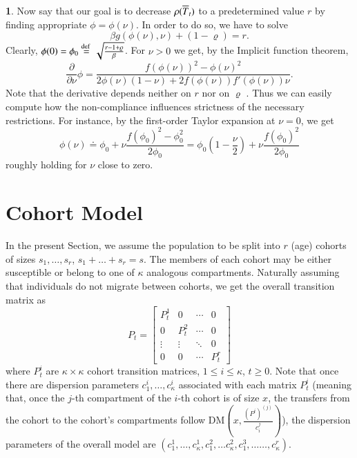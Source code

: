 \documentclass[english]{elsarticle}
\theoremstyle{plain}
\theoremstyle{remark}
\theoremstyle{plain}
\theoremstyle{definition}
\newtheorem{example}[thm]{\protect\examplename}
\providecommand{\examplename}{Example}
\begin{document}
\begin{example}
Now say that our goal is to decrease $\rho(\overline{T}_{t})$ to a predetermined
value $r$ by finding appropriate $\phi=\phi(\nu)$. In order to do
so, we have to solve
\[
\beta g(\phi(\nu),\nu)+(1-\varrho)=r.
\]
Clearly, $\phi(0)=\phi_{0}\stackrel{\text{def }}{=}\sqrt{\frac{r-1+\varrho}{\beta}}$.
For $\nu>0$ we get, by the Implicit function theorem, 
\[
\frac{\partial}{\partial\nu}\phi=\frac{f(\phi(\nu))^{2}-\phi(\nu)^{2}}{2\phi(\nu)(1-\nu)+2f(\phi(\nu))f'(\phi(\nu))\nu}.
\]
Note that the derivative depends neither on $r$ nor on $\varrho$
. Thus we can easily compute how the non-compliance influences strictness
of the necessary restrictions. For instance, by the first-order Taylor
expansion at $\nu=0$, we get 
\[
\phi(\nu)\doteq\phi_{0}+\nu\frac{f(\phi_{0})^{2}-\phi_{0}^{2}}{2\phi_{0}}=\phi_{0}\left(1-\frac{\nu}{2}\right)+\nu\frac{f(\phi_{0})^{2}}{2\phi_{0}}
\]
roughly holding for $\nu$ close to zero.
\end{example}



\section{Cohort Model\label{sec:cohorts}}

In the present Section, we assume the population to be split into
$r$ (age) cohorts of sizes $s_{1},\dots,s_{r}$, $s_{1}+\dots+s_{r}=s$.
The members of each cohort may be either susceptible or belong to
one of $\kappa$ analogous compartments. Naturally assuming that individuals
do not migrate between cohorts, we get the overall transition matrix
as 
\[
P_{t}=\left[\begin{array}{cccc}
P_{t}^{1} & 0 & \cdots & 0\\
0 & P_{t}^{2} & \cdots & 0\\
\vdots & \vdots & \ddots & 0\\
0 & 0 & \cdots & P_{t}^{r}
\end{array}\right]
\]
where $P_{t}^{i}$ are $\kappa\times\kappa$ cohort transition matrices,
$1\leq i\leq\kappa$, $t\geq0$. Note that once there are dispersion
parameters $c_{1}^{i},\dots,c_{\kappa}^{i}$ associated with each
matrix $P_{t}^{i}$ (meaning that, once the $j$-th compartment of
the $i$-th cohort is of size $x$, the transfers from the cohort
to the cohort's compartments follow $\mathrm{DM}(x,\frac{(P^{i})^{(j)}}{c_{i}^{j}})$),
the dispersion parameters of the overall model are $(c_{1}^{1},\dots,c_{\kappa}^{1},c_{1}^{2},\dots c_{\kappa}^{2},c_{1}^{3},\dots\dots,c_{\kappa}^{r}).$
\end{document}
